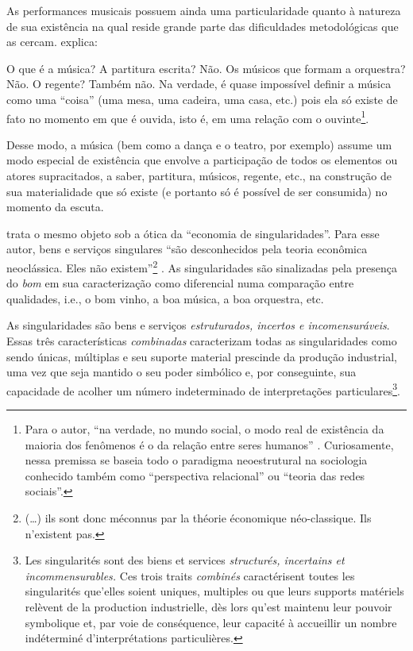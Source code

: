 \documentclass[a4paper, 12pt, openright, oneside, german, french, english, brazil]{abntex2}
\begin{document}
	As performances musicais possuem ainda uma particularidade quanto à natureza de sua existência na qual reside grande parte das dificuldades metodológicas que as cercam.  explica:
	
	\begin{citacao}
		O que é a música? A partitura escrita? Não. Os músicos que formam a orquestra? Não. O regente? Também não. Na verdade, é quase impossível definir a música como uma ``coisa'' (uma mesa, uma cadeira, uma casa, etc.) pois ela só existe de fato no momento em que é ouvida, isto é, em uma relação com o ouvinte\footnote{Para o autor, ``na verdade, no mundo social, o modo real de existência da maioria dos fenômenos é o da relação entre seres humanos'' \cite[p. 110]{tolila2007cultura}. Curiosamente, nessa premissa se baseia todo o paradigma neoestrutural na sociologia conhecido também como ``perspectiva relacional'' ou ``teoria das redes sociais''.}. \cite[p. 109]{tolila2007cultura}
	\end{citacao}
	
	Desse modo, a música (bem como a dança e o teatro, por exemplo) assume um modo especial de existência que envolve a participação de todos os elementos ou atores supracitados, a saber, partitura, músicos, regente, etc., na construção de sua materialidade que só existe (e portanto só é possível de ser consumida) no momento da escuta.
	
	 trata o mesmo objeto sob a ótica da ``economia de singularidades''. Para esse autor, bens e serviços singulares ``são desconhecidos pela teoria econômica neoclássica. Eles não existem''\footnote{(\dots) ils sont donc méconnus par la théorie économique néo-classique. Ils n'existent pas.} \cite[p. 163]{karpik2009elements}. As singularidades são sinalizadas pela presença do \textit{bom} em sua caracterização como diferencial numa comparação entre qualidades, i.e., o bom vinho, a boa música, a boa orquestra, etc. 
	
	\begin{citacao}
		As singularidades são bens e serviços \textit{estruturados, incertos e incomensuráveis}. Essas três características \textit{combinadas} caracterizam todas as singularidades como sendo únicas, múltiplas e seu suporte material prescinde da produção industrial, uma vez que seja mantido o seu poder simbólico e, por conseguinte, sua capacidade de acolher um número indeterminado de interpretações particulares\footnote{Les singularités sont des biens et services \textit{structurés, incertains et incommensurables.} Ces trois traits \textit{combinés} caractérisent toutes les singularités que'elles soient uniques, multiples ou que leurs supports matériels relèvent de la production industrielle, dès lors qu'est maintenu leur pouvoir symbolique et, par voie de conséquence, leur capacité à accueillir un nombre indéterminé d'interprétations particulières.}. \cite[p. 164]{karpik2009elements}
	\end{citacao}
	
\end{document}
